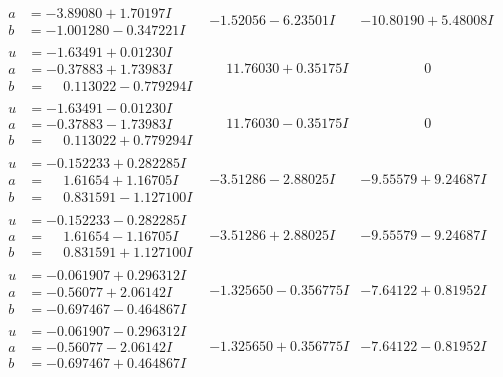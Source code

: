 \documentclass[1p]{elsarticle_modified}
\theoremstyle{definition}
\begin{document}
$$\begin{array}{c|c|c}
\begin{aligned}
a &= -3.89080 + 1.70197 I \\
b &= -1.001280 - 0.347221 I\end{aligned}
 & -1.52056 - 6.23501 I & -10.80190 + 5.48008 I \\ \hline\begin{aligned}
u &= -1.63491 + 0.01230 I \\
a &= -0.37883 + 1.73983 I \\
b &= \phantom{-}0.113022 - 0.779294 I\end{aligned}
 & \phantom{-}11.76030 + 0.35175 I & \phantom{-0.000000 } 0 \\ \hline\begin{aligned}
u &= -1.63491 - 0.01230 I \\
a &= -0.37883 - 1.73983 I \\
b &= \phantom{-}0.113022 + 0.779294 I\end{aligned}
 & \phantom{-}11.76030 - 0.35175 I & \phantom{-0.000000 } 0 \\ \hline\begin{aligned}
u &= -0.152233 + 0.282285 I \\
a &= \phantom{-}1.61654 + 1.16705 I \\
b &= \phantom{-}0.831591 - 1.127100 I\end{aligned}
 & -3.51286 - 2.88025 I & -9.55579 + 9.24687 I \\ \hline\begin{aligned}
u &= -0.152233 - 0.282285 I \\
a &= \phantom{-}1.61654 - 1.16705 I \\
b &= \phantom{-}0.831591 + 1.127100 I\end{aligned}
 & -3.51286 + 2.88025 I & -9.55579 - 9.24687 I \\ \hline\begin{aligned}
u &= -0.061907 + 0.296312 I \\
a &= -0.56077 + 2.06142 I \\
b &= -0.697467 - 0.464867 I\end{aligned}
 & -1.325650 - 0.356775 I & -7.64122 + 0.81952 I \\ \hline\begin{aligned}
u &= -0.061907 - 0.296312 I \\
a &= -0.56077 - 2.06142 I \\
b &= -0.697467 + 0.464867 I\end{aligned}
 & -1.325650 + 0.356775 I & -7.64122 - 0.81952 I \\ \hline\begin{aligned}

\end{aligned}
\end{array}$$
\end{document}
